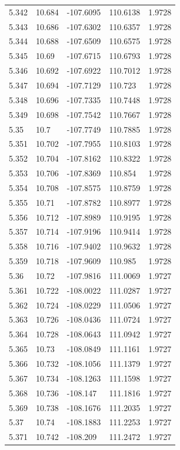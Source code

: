 \begin{tabular}{lllll}
5.342 & 10.684 & -107.6095 & 110.6138 & 1.9728 \\
5.343 & 10.686 & -107.6302 & 110.6357 & 1.9728 \\
5.344 & 10.688 & -107.6509 & 110.6575 & 1.9728 \\
5.345 & 10.69 & -107.6715 & 110.6793 & 1.9728 \\
5.346 & 10.692 & -107.6922 & 110.7012 & 1.9728 \\
5.347 & 10.694 & -107.7129 & 110.723 & 1.9728 \\
5.348 & 10.696 & -107.7335 & 110.7448 & 1.9728 \\
5.349 & 10.698 & -107.7542 & 110.7667 & 1.9728 \\
5.35 & 10.7 & -107.7749 & 110.7885 & 1.9728 \\
5.351 & 10.702 & -107.7955 & 110.8103 & 1.9728 \\
5.352 & 10.704 & -107.8162 & 110.8322 & 1.9728 \\
5.353 & 10.706 & -107.8369 & 110.854 & 1.9728 \\
5.354 & 10.708 & -107.8575 & 110.8759 & 1.9728 \\
5.355 & 10.71 & -107.8782 & 110.8977 & 1.9728 \\
5.356 & 10.712 & -107.8989 & 110.9195 & 1.9728 \\
5.357 & 10.714 & -107.9196 & 110.9414 & 1.9728 \\
5.358 & 10.716 & -107.9402 & 110.9632 & 1.9728 \\
5.359 & 10.718 & -107.9609 & 110.985 & 1.9728 \\
5.36 & 10.72 & -107.9816 & 111.0069 & 1.9727 \\
5.361 & 10.722 & -108.0022 & 111.0287 & 1.9727 \\
5.362 & 10.724 & -108.0229 & 111.0506 & 1.9727 \\
5.363 & 10.726 & -108.0436 & 111.0724 & 1.9727 \\
5.364 & 10.728 & -108.0643 & 111.0942 & 1.9727 \\
5.365 & 10.73 & -108.0849 & 111.1161 & 1.9727 \\
5.366 & 10.732 & -108.1056 & 111.1379 & 1.9727 \\
5.367 & 10.734 & -108.1263 & 111.1598 & 1.9727 \\
5.368 & 10.736 & -108.147 & 111.1816 & 1.9727 \\
5.369 & 10.738 & -108.1676 & 111.2035 & 1.9727 \\
5.37 & 10.74 & -108.1883 & 111.2253 & 1.9727 \\
5.371 & 10.742 & -108.209 & 111.2472 & 1.9727 \\

\end{tabular}
